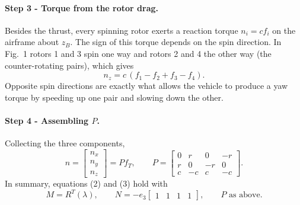 \paragraph{Step 3 - Torque from the rotor drag.}
Besides the thrust, every spinning rotor exerts a reaction torque $n_i = c f_i$ on the airframe about $z_B$.
The sign of this torque depends on the spin direction.
In Fig.~1 rotors 1 and 3 spin one way and rotors 2 and 4 the other way (the counter-rotating pairs), which gives
\begin{equation*}
n_z = c\,(f_1 - f_2 + f_3 - f_4).
\end{equation*}
Opposite spin directions are exactly what allows the vehicle to produce a yaw torque by speeding up one pair and slowing down the other.

\paragraph{Step 4 - Assembling $P$.}
Collecting the three components,
\begin{equation*}
n = \begin{bmatrix} n_x \\ n_y \\ n_z \end{bmatrix} = P f_T, \qquad
P = \begin{bmatrix} 0 & r & 0 & -r \\ r & 0 & -r & 0 \\ c & -c & c & -c \end{bmatrix}.
\end{equation*}
In summary, equations (2) and (3) hold with
\begin{equation*}
M = R^T(\lambda), \qquad
N = -e_3 \begin{bmatrix} 1 & 1 & 1 & 1 \end{bmatrix}, \qquad
P \text{ as above.}
\end{equation*}
